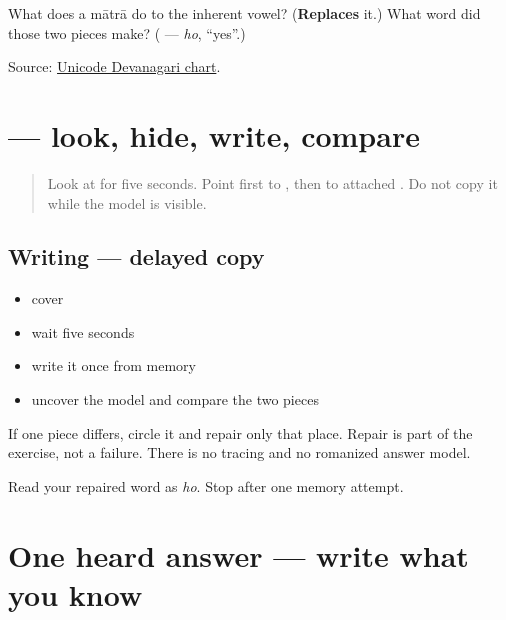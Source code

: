 \begin{tcolorbox}[breakable,colback=teal!4,colframe=teal!35!black,title={Before you move on}]
What does a mātrā do to the inherent vowel? (\textbf{Replaces} it.) What word did those two pieces make? (\textbf{} — \emph{ho}, \textquotedblleft{}yes\textquotedblright{}.)

Source: \href{https://www.unicode.org/charts/PDF/U0900.pdf}{Unicode Devanagari chart}.
\end{tcolorbox}
\section[\texorpdfstring{\mr{हो} (ho)}{हो (ho)}]{ — look, hide, write, compare}

\label{lesson:MR-W01-ho-delayed-copy}



\begin{quote}
Look at \textbf{} for five seconds. Point first to \textbf{}, then to attached \textbf{}. Do not copy it while the model is visible.
\end{quote}

\subsection*{Writing — delayed copy}
\begin{itemize}
\raggedright
  \item cover \textbf{}
  \item wait five seconds
  \item write it once from memory
  \item uncover the model and compare the two pieces
\end{itemize}

If one piece differs, circle it and repair only that place. Repair is part of the exercise, not a failure. There is no tracing and no romanized answer model.

\begin{tcolorbox}[breakable,colback=teal!4,colframe=teal!35!black,title={Before you move on}]
Read your repaired word as \emph{ho}. Stop after one memory attempt.
\end{tcolorbox}
\section[\texorpdfstring{\mr{हो} (ho)}{हो (ho)}]{One heard answer — write what you know}

